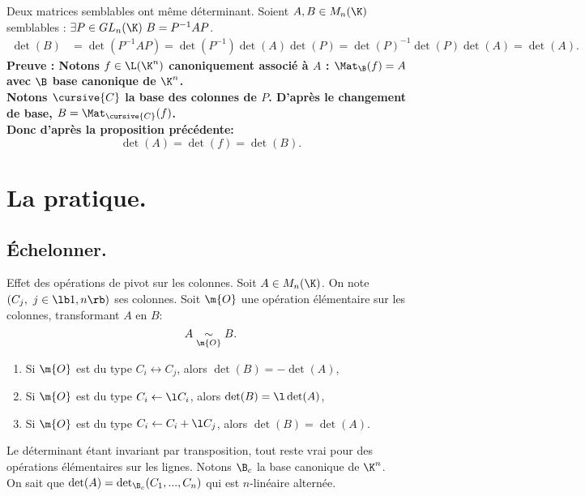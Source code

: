 \documentclass[11pt]{article}
\begin{document}
\begin{corr}{}{}
    Deux matrices semblables ont même déterminant.
    \tcblower
    Soient $A,B\in M_n(\K)$ semblables : $\exists P\in GL_n(\K)~B=P^{-1}AP$.
    \begin{align*}
        \det(B)&=\det(P^{-1}AP)=\det(P^{-1})\det(A)\det(P)=\det(P)^{-1}\det(P)\det(A)=\det(A).
    \end{align*}
    \bf{Preuve :}\n
    Notons $f\in\L(\K^n)$ canoniquement associé à $A$ : $\Mat_\B(f)=A$ avec $\B$ base canonique de $\K^n$.\\
    Notons $\cursive{C}$ la base des colonnes de $P$. D'après le changement de base, $B=\Mat_{\cursive{C}}(f)$.\\
    Donc d'après la proposition précédente:
    \begin{equation*}
        \det(A) = \det(f) = \det(B).
    \end{equation*}
\end{corr}
 
\section{La pratique.}

\subsection{Échelonner.}

\begin{prop}{Effet des opérations de pivot sur les colonnes.}{}
    Soit $A\in M_n(\K)$. On note $(C_j,~j\in\lb1,n\rb)$ ses colonnes. Soit $\m{O}$ une opération élémentaire sur les colonnes, transformant $A$ en $B$:
    \begin{equation*}
        A\underset{\m{O}}{\sim}B.
    \end{equation*}
    \begin{enumerate}[topsep=0pt,itemsep=-0.9 ex]
        \item Si $\m{O}$ est du type $C_i \leftrightarrow C_j$, alors $\det(B)=-\det(A)$,
        \item Si $\m{O}$ est du type $C_i \leftarrow \l C_i$, alors $\det(B)=\l \det(A)$,
        \item Si $\m{O}$ est du type $C_i \leftarrow C_i+\l C_j$, alors $\det(B)=\det(A)$.
    \end{enumerate}\vspace{0.25cm}
    Le déterminant étant invariant par transposition, tout reste vrai pour des opérations élémentaires sur les lignes.
    \tcblower
    Notons $\B_c$ la base canonique de $\K^n$.\\
    On sait que $\det(A)=\det_{\B_c}(C_1,...,C_n)$ qui est $n$-linéaire alternée.
\end{prop}
\end{document}
